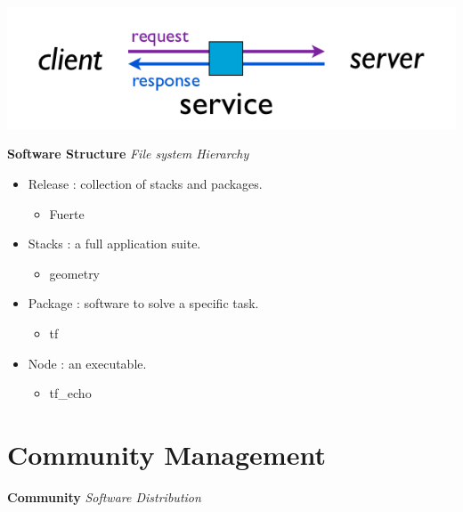 \documentclass[a4paper, 11pt, conference]{ieeeconf}       %
\begin{document}
\begin{center}
  \includegraphics[width=.6\textwidth]{service}
\end{center}



\textbf{Software Structure}
\textit{File system Hierarchy}

\begin{itemize}
  \item Release : collection of stacks and packages.
  \begin{itemize}
    \item Fuerte
  \end{itemize}
  \item Stacks : a full application suite.
  \begin{itemize}
    \item geometry
  \end{itemize}
  \item Package : software to solve a specific task.
  \begin{itemize}
    \item tf
  \end{itemize}
  \item Node : an executable.
  \begin{itemize}
    \item tf\_echo
  \end{itemize}
\end{itemize}



\section{Community Management}

\textbf{Community}
\textit{Software Distribution}
\end{document}
